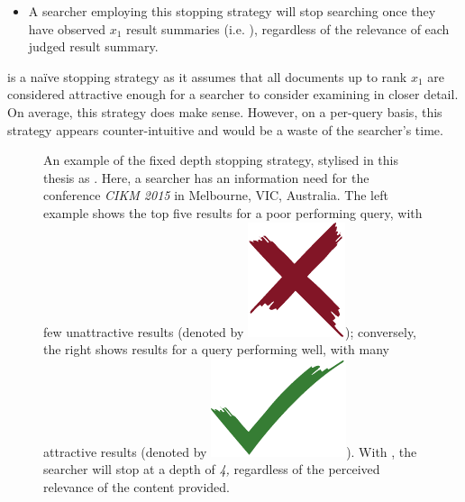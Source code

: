 \begin{itemize}
    \item{} A searcher employing this stopping strategy will stop searching once they have observed $x_1$ result summaries (i.e. ), regardless of the relevance of each judged result summary.
\end{itemize}

 is a na\"{i}ve stopping strategy as it assumes that all documents up to rank $x_1$ are considered attractive enough for a searcher to consider examining in closer detail. On average, this strategy does make sense. However, on a per-query basis, this strategy appears counter-intuitive and would be a waste of the searcher's time.

\begin{figure}[t!]
    \centering
    \caption[Examples of the fixed depth stopping strategy, ]{An example of the fixed depth stopping strategy, stylised in this thesis as . Here, a searcher has an information need for the conference \emph{CIKM 2015} in Melbourne, VIC, Australia. The left example shows the top five results for a poor performing query, with few unattractive results (denoted by {\includegraphics[height=\fontcharht\font`\d]{figures/ch0-cross.pdf}}); conversely, the right shows results for a query performing well, with many attractive results (denoted by {\includegraphics[height=\fontcharht\font`\d]{figures/ch0-tick.pdf}}). With , the searcher will stop at a depth of \emph{4,} regardless of the perceived relevance of the content provided.}
    \label{fig:ss1}
\end{figure}

